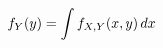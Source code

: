 \documentclass[preview]{standalone}
\begin{document}
\begin{align*}
\special{dvisvgm:raw <g id='unique000'>}f_Y(y)=\int f_{X,Y}(x,y)\,dx\special{dvisvgm:raw </g>}
\end{align*}
\end{document}
